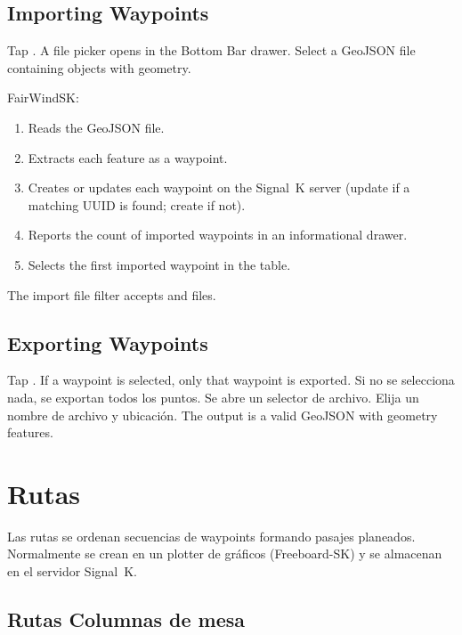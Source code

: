 \section{Importing Waypoints}

Tap . A file picker opens in the Bottom Bar drawer.
Select a GeoJSON file containing  objects with  geometry.

FairWindSK:
\begin{enumerate}
  \item Reads the GeoJSON file.
  \item Extracts each  feature as a waypoint.
  \item Creates or updates each waypoint on the Signal~K server (update if a matching UUID is found; create if not).
  \item Reports the count of imported waypoints in an informational drawer.
  \item Selects the first imported waypoint in the table.
\end{enumerate}

The import file filter accepts  and  files.

\section{Exporting Waypoints}

Tap . If a waypoint is selected, only that waypoint is exported.
Si no se selecciona nada, se exportan todos los puntos.
Se abre un selector de archivo. Elija un nombre de archivo y ubicación.
The output is a valid GeoJSON  with  geometry features.

\chapter{Rutas}
\label{ch:routes}

Las rutas se ordenan secuencias de waypoints formando pasajes planeados.
Normalmente se crean en un plotter de gráficos (Freeboard-SK) y se almacenan en el servidor Signal~K.


\section{Rutas Columnas de mesa}

